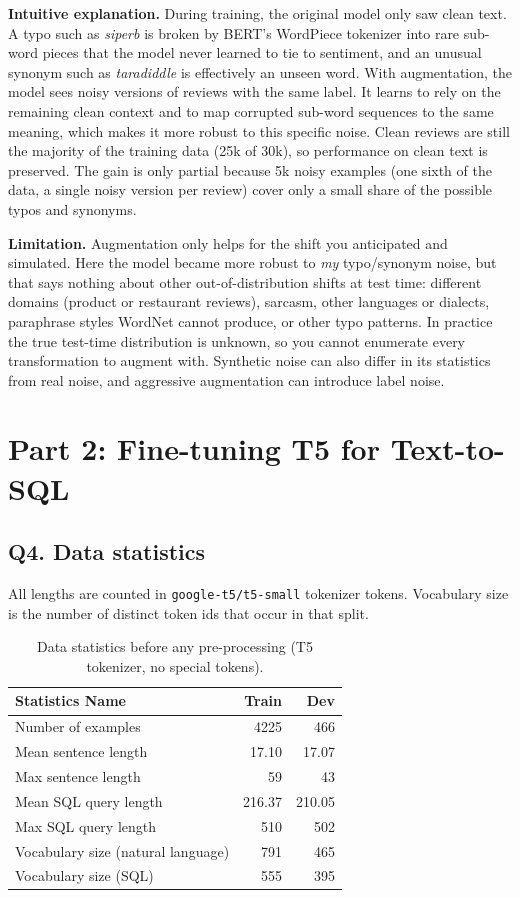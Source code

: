 \documentclass[11pt]{article}
\begin{document}
\textbf{Intuitive explanation.} During training, the original model only saw clean text. A typo such as
\emph{siperb} is broken by BERT's WordPiece tokenizer into rare sub-word pieces that the model never learned to tie
to sentiment, and an unusual synonym such as \emph{taradiddle} is effectively an unseen word. With augmentation,
the model sees noisy versions of reviews with the same label. It learns to rely on the remaining clean context and
to map corrupted sub-word sequences to the same meaning, which makes it more robust to this specific noise.
Clean reviews are still the majority of the training data (25k of 30k), so performance on clean text is preserved.
The gain is only partial because 5k noisy examples (one sixth of the data, a single noisy version per review)
cover only a small share of the possible typos and synonyms.

\textbf{Limitation.} Augmentation only helps for the shift you anticipated and simulated. Here the model became more
robust to \emph{my} typo/synonym noise, but that says nothing about other out-of-distribution shifts at test
time: different domains (product or restaurant reviews), sarcasm, other languages or dialects, paraphrase styles
WordNet cannot produce, or other typo patterns. In practice the true test-time distribution is unknown, so you
cannot enumerate every transformation to augment with. Synthetic noise can also differ in its statistics from
real noise, and aggressive augmentation can introduce label noise.

\section*{Part 2: Fine-tuning T5 for Text-to-SQL}

\subsection*{Q4. Data statistics}
All lengths are counted in \texttt{google-t5/t5-small} tokenizer tokens. Vocabulary size is the number of distinct
token ids that occur in that split.

\begin{table}[H]
\centering
\begin{tabular}{lrr}
\toprule
Statistics Name & Train & Dev \\
\midrule
Number of examples & 4225 & 466 \\
Mean sentence length & 17.10 & 17.07 \\
Max sentence length & 59 & 43 \\
Mean SQL query length & 216.37 & 210.05 \\
Max SQL query length & 510 & 502 \\
Vocabulary size (natural language) & 791 & 465 \\
Vocabulary size (SQL) & 555 & 395 \\
\bottomrule
\end{tabular}
\caption{Data statistics before any pre-processing (T5 tokenizer, no special tokens).}
\end{table}
\end{document}
